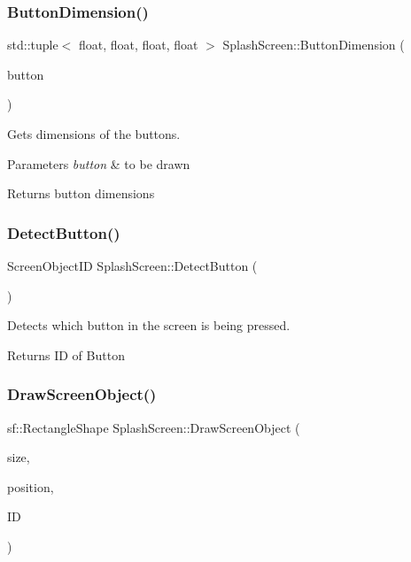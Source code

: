 \subsubsection{\texorpdfstring{Button\+Dimension()}{ButtonDimension()}}
{\footnotesize\ttfamily std\+::tuple$<$ float, float, float, float $>$ Splash\+Screen\+::\+Button\+Dimension (\begin{DoxyParamCaption}\item[{sf\+::\+Rectangle\+Shape}]{button }\end{DoxyParamCaption})\hspace{0.3cm}{\ttfamily [private]}}



Gets dimensions of the buttons. 


\begin{DoxyParams}{Parameters}
{\em button} & to be drawn \\
\hline
\end{DoxyParams}
\begin{DoxyReturn}{Returns}
button dimensions 
\end{DoxyReturn}
\mbox{\label{class_splash_screen_a9ee25ec3f5cf41323a5fc4f99b2b1016}} 
\subsubsection{\texorpdfstring{Detect\+Button()}{DetectButton()}}
{\footnotesize\ttfamily Screen\+Object\+ID Splash\+Screen\+::\+Detect\+Button (\begin{DoxyParamCaption}{ }\end{DoxyParamCaption})}



Detects which button in the screen is being pressed. 

\begin{DoxyReturn}{Returns}
ID of Button 
\end{DoxyReturn}
\mbox{\label{class_splash_screen_af34b1a6b28c5fe8f4124ff7d94be6c55}} 
\subsubsection{\texorpdfstring{Draw\+Screen\+Object()}{DrawScreenObject()}}
{\footnotesize\ttfamily sf\+::\+Rectangle\+Shape Splash\+Screen\+::\+Draw\+Screen\+Object (\begin{DoxyParamCaption}\item[{const \mbox{\hyperlink{classvector2_d}{vector2D}} \&}]{size,  }\item[{const \mbox{\hyperlink{classvector2_d}{vector2D}} \&}]{position,  }\item[{Screen\+Object\+ID}]{ID }\end{DoxyParamCaption})\hspace{0.3cm}{\ttfamily [private]}}



